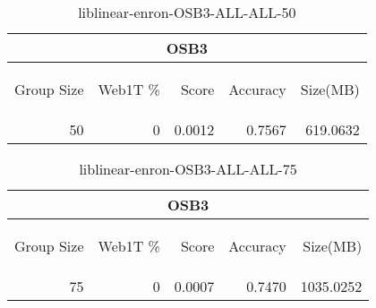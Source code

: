 \begin{center}
\begin{table}[htbp] 
 \begin{center}
\begin{tabular}{ | r | r | r | r | r |}
\hline
\multicolumn{5}{|c|}{OSB3}\\
\hline
\begin{sideways}Group Size\end{sideways} & \begin{sideways}Web1T \%\end{sideways} & \begin{sideways}Score\end{sideways} & \begin{sideways}Accuracy\end{sideways} & \begin{sideways}Size(MB)\end{sideways}\\
\hline
\multirow{0}{*}{50}
 & 0 & 0.0012 & 0.7567 & 619.0632\\ \cline{2-5}
\hline
\end{tabular}
\caption{liblinear-enron-OSB3-ALL-ALL-50}
\label{table:liblinear-enron-OSB3-ALL-ALL-50}
\end{center}
 \end{table}
\end{center}

\begin{center}
\begin{table}[htbp] 
 \begin{center}
\begin{tabular}{ | r | r | r | r | r |}
\hline
\multicolumn{5}{|c|}{OSB3}\\
\hline
\begin{sideways}Group Size\end{sideways} & \begin{sideways}Web1T \%\end{sideways} & \begin{sideways}Score\end{sideways} & \begin{sideways}Accuracy\end{sideways} & \begin{sideways}Size(MB)\end{sideways}\\
\hline
\multirow{0}{*}{75}
 & 0 & 0.0007 & 0.7470 & 1035.0252\\ \cline{2-5}
\hline
\end{tabular}
\caption{liblinear-enron-OSB3-ALL-ALL-75}
\label{table:liblinear-enron-OSB3-ALL-ALL-75}
\end{center}
 \end{table}
\end{center}

